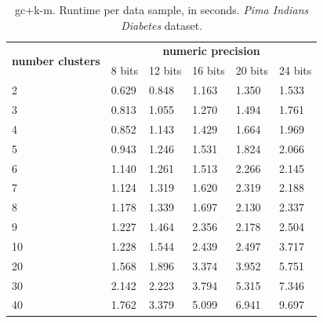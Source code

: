 \begin{table}[htp]
\centering
\caption{\acs{gc}+\acs{k-m}. Runtime per data sample, in seconds. \emph{Pima Indians Diabetes} dataset.}
\label{table:runtimeKMPID}
\begin{tabular}{|l|l|l|l|l|l|}
\hline
\multirow{2}{*}{\textbf{number clusters}} & \multicolumn{5}{c|}{\textbf{numeric precision}}                                              \\ \cline{2-6}
                                          & 8 bits & 12 bits & 16 bits & 20 bits & 24 bits \\ \hline
2                                & 0.629           & 0.848            & 1.163            & 1.350            & 1.533            \\ \hline
3                                & 0.813           & 1.055            & 1.270            & 1.494            & 1.761            \\ \hline
4                                & 0.852           & 1.143            & 1.429            & 1.664            & 1.969            \\ \hline
5                                & 0.943           & 1.246            & 1.531            & 1.824            & 2.066            \\ \hline
6                                & 1.140           & 1.261            & 1.513            & 2.266            & 2.145            \\ \hline
7                                & 1.124           & 1.319            & 1.620            & 2.319            & 2.188            \\ \hline
8                                & 1.178           & 1.339            & 1.697            & 2.130            & 2.337            \\ \hline
9                                & 1.227           & 1.464            & 2.356            & 2.178            & 2.504            \\ \hline
10                               & 1.228           & 1.544            & 2.439            & 2.497            & 3.717            \\ \hline
20                               & 1.568           & 1.896            & 3.374            & 3.952            & 5.751            \\ \hline
30                               & 2.142           & 2.223            & 3.794            & 5.315            & 7.346            \\ \hline
40                               & 1.762           & 3.379            & 5.099            & 6.941            & 9.697            \\ \hline

\end{tabular}
\end{table}
